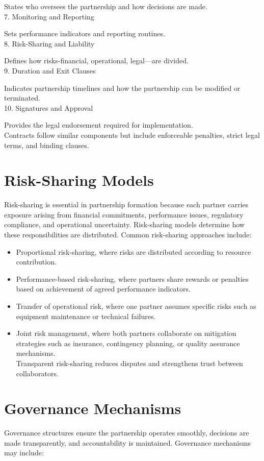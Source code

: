 \documentclass[10pt]{article}
\begin{document}
States who oversees the partnership and how decisions are made.\\
7. Monitoring and Reporting

Sets performance indicators and reporting routines.\\
8. Risk-Sharing and Liability

Defines how risks-financial, operational, legal—are divided.\\
9. Duration and Exit Clauses

Indicates partnership timelines and how the partnership can be modified or terminated.\\
10. Signatures and Approval

Provides the legal endorsement required for implementation.\\
Contracts follow similar components but include enforceable penalties, strict legal terms, and binding clauses.

\section*{Risk-Sharing Models}
Risk-sharing is essential in partnership formation because each partner carries exposure arising from financial commitments, performance issues, regulatory compliance, and operational uncertainty. Risk-sharing models determine how these responsibilities are distributed. Common risk-sharing approaches include:

\begin{itemize}
  \item Proportional risk-sharing, where risks are distributed according to resource contribution.
  \item Performance-based risk-sharing, where partners share rewards or penalties based on achievement of agreed performance indicators.
  \item Transfer of operational risk, where one partner assumes specific risks such as equipment maintenance or technical failures.
  \item Joint risk management, where both partners collaborate on mitigation strategies such as insurance, contingency planning, or quality assurance mechanisms.\\
Transparent risk-sharing reduces disputes and strengthens trust between collaborators.
\end{itemize}

\section*{Governance Mechanisms}
Governance structures ensure the partnership operates smoothly, decisions are made transparently, and accountability is maintained. Governance mechanisms may include:
\end{document}
